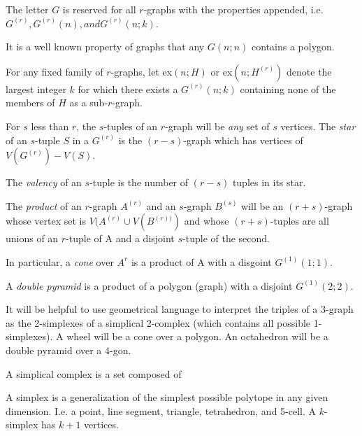 \begin{definition}
    The letter $G$ is reserved for all  $r$-graphs with the properties appended, i.e. $G^{(r)}, G^{(r)}(n), and G^{(r)}(n;k)$.
\end{definition}
\begin{note}
    It is a well known property of graphs that any $G(n;n)$ contains a polygon. 
\end{note}
\begin{definition}
    For any fixed family of $r$-graphs, let ex$(n;H)$ or ex$(n;H^{(r)})$ denote the largest integer $k$ for which there exists a $G^{(r)}(n;k)$ containing none of the members of $H$ as a sub-$r$-graph. 
\end{definition}
\begin{remark}
    For $s$ less than $r$, the $s$-tuples of an $r$-graph will be \textit{any} set of $s$ vertices. The \textit{star} of an $s$-tuple $S$ in a $G^{(r)}$ is the $(r-s)$-graph which has vertices of $V(G^{(r)}) - V(S)$. 
\end{remark}
\begin{definition}
    The \textit{valency} of an $s$-tuple is the number of $(r-s)$ tuples in its star.
\end{definition}
\begin{definition}
    The \textit{product} of an $r$-graph $A^{(r)}$ and an $s$-graph $B^{(s)}$ will be an $(r+s)$-graph whose vertex set is $V(A^{(r)}\cup V(B^{(r))})$ and whose $(r+s)$-tuples are all unions of an $r$-tuple of A and a disjoint $s$-tuple of the second.
\end{definition}
\begin{definition}
    In particular, a \textit{cone} over $A^{r}$ is a product of A with a disgoint $G^{(1)}(1;1)$.
\end{definition}
\begin{definition}
    A \textit{double pyramid} is a product of a polygon (graph) with a disjoint $G^{(1)}(2;2)$.
\end{definition}
\begin{note}
    It will be helpful to use geometrical language to interpret the triples of a 3-graph as the 2-simplexes of a simplical 2-complex (which contains all possible 1-simplexes). A wheel will be a cone over a polygon. An octahedron will be a double pyramid over a 4-gon. 
\end{note}
\begin{explanation}
        A simplical complex is a set composed of 
\end{explanation}
\begin{note}
    A simplex is a generalization of the simplest possible polytope in any given dimension. I.e. a point, line segment, triangle, tetrahedron, and 5-cell. A $k$-simplex has $k+1$ vertices. 
\end{note}